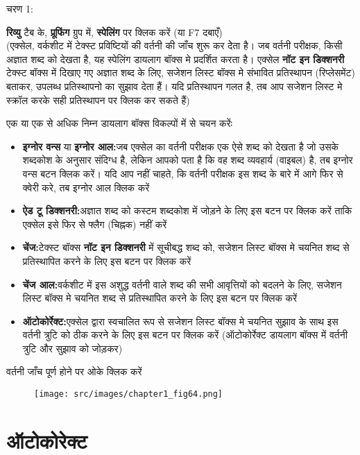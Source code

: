 \begin{descriptionSimple}{चरण 1:}
\item[चरण 1] \textbf{रिव्यु} टैब के, \textbf{प्रूफिंग} ग्रुप में, \textbf{स्पेलिंग} पर क्लिक करें (या  {\rm F7}  दबाएँ)\\  (एक्सेल, वर्कशीट में टेक्स्ट प्रविष्टियों की वर्तनी की जाँच शुरू कर देेता है। जब वर्तनी परीक्षक, किसी अज्ञात शब्द को देखता है, यह स्पेलिंग डायलाग बॉक्स मे प्रदर्शित करता है। एक्सेल \textbf{नॉट इन डिक्शनरी} टेक्स्ट बॉक्स में दिखाए गए अज्ञात शब्द के लिए, सजेशन लिस्ट बॉक्स मे संभावित प्रतिस्थापन (रिप्लेसमेंट) बताकर, उपलब्ध प्रतिस्थापनो का सुझाव देता हैं। यदि प्रतिस्थापन गलत है, तब आप सजेशन लिस्ट मे स्क्रॉल करके सही प्रतिस्थापन पर क्लिक कर सकते हैं)
\item[चरण 2] एक या एक से अधिक निम्न डायलाग बॉक्स विकल्पों में से चयन करेंः
		\begin{itemize}
		\item \textbf{इग्नोर वन्स} या \textbf{इग्नोर आल:}जब एक्सेल का वर्तनी परीक्षक एक ऐसे शब्द को देखता है जो उसके शब्दकोश के अनुसार संदिग्ध है, लेकिन आपको पता है कि वह शब्द व्यवहार्य (वाइबल) है, तब इग्नोर वन्स बटन क्लिक करें। यदि आप नहीं चाहते, कि वर्तनी परीक्षक इस शब्द के बारे में आगे फिर से क्वेरी करे, तब इग्नोर आल क्लिक करें
		\item \textbf{ऐड टू डिक्शनरी:}अज्ञात शब्द को कस्टम शब्दकोश में जोड़ने के लिए इस बटन पर क्लिक करें ताकि एक्सेल इसे फिर से फ्लैग (चिह्नक) नहीं करें
		\item \textbf{चेंज:}टेक्स्ट बॉक्स \textbf{नॉट इन डिक्शनरी} में सूचीबद्ध शब्द को, सजेशन लिस्ट बॉक्स मे चयनित शब्द से प्रतिस्थापित करने के लिए इस बटन पर क्लिक करें
		\item \textbf{चेंज आल:}वर्कशीट में इस अशुद्ध वर्तनी वाले शब्द की सभी आवृत्तियों को बदलने के लिए, सजेशन लिस्ट बॉक्स मे चयनित शब्द से प्रतिस्थापित करने के लिए इस बटन पर क्लिक करें
		\item \textbf{ऑटोकोर्रेक्ट:}एक्सेल द्वारा स्वचालित रूप से सजेशन लिस्ट बॉक्स मे चयनित सुझाव के साथ इस वर्तनी त्रुटि को ठीक करने के लिए इस बटन पर क्लिक करें (ऑटोकोर्रेक्ट डायलाग बॉक्स में वर्तनी त्रुटि और सुझाव को जोड़कर)
		\end{itemize}
\item[चरण 3] वर्तनी जाँच पूर्ण होने पर ओके क्लिक करें
\end{descriptionSimple}
\begin{figure}[H]
\centering
\texttt{[image: src/images/chapter1\_fig64.png]}
\end{figure}
					
\section{ऑटोकोरेक्ट}\label{id-1.40}

